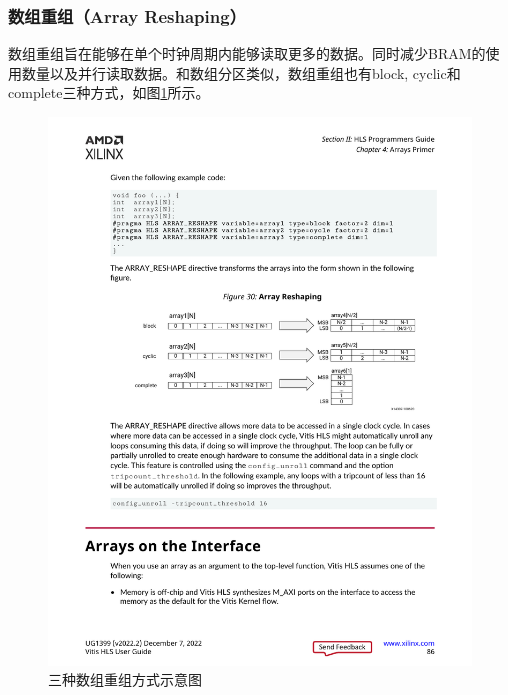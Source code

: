 \subsubsection{数组重组（Array Reshaping）}


数组重组旨在能够在单个时钟周期内能够读取更多的数据。同时减少BRAM的使用数量以及并行读取数据\cite{noauthor_vitis_2022}。和数组分区类似，数组重组也有block, cyclic和complete三种方式，如图\ref{fig:array_reshaping}所示。

\begin{figure}[htbp]
    \centering
    \includegraphics[width=\linewidth]{figures/array_reshaping.pdf}
    \caption{三种数组重组方式示意图}
    \label{fig:array_reshaping}
\end{figure}





